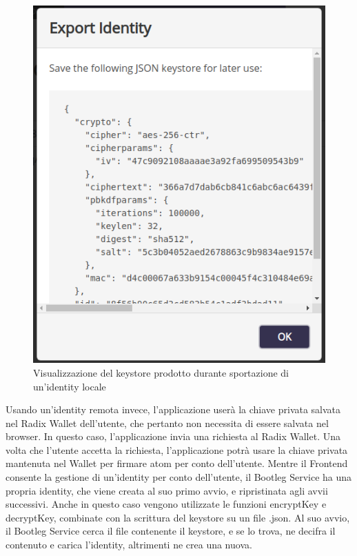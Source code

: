 \begin{figure}[H]
  \centering
  \includegraphics[scale=0.6]{images/application/save-keystore.png}
  \caption{Visualizzazione del keystore prodotto durante sportazione di un'identity locale}
  \label{fig:save_keystore}
\end{figure}

Usando un'identity remota invece, l'applicazione userà la chiave privata salvata nel Radix Wallet dell'utente, che pertanto non necessita di essere salvata nel browser. In questo caso, l'applicazione invia una richiesta al Radix Wallet. Una volta che l'utente accetta la richiesta, l'applicazione potrà usare la chiave privata mantenuta nel Wallet per firmare atom per conto dell'utente.
Mentre il Frontend consente la gestione di un'identity per conto dell'utente, il Bootleg Service ha una propria identity, che viene creata al suo primo avvio, e ripristinata agli avvii successivi. Anche in questo caso vengono utilizzate le funzioni encryptKey e decryptKey, combinate con la scrittura del keystore su un file .json. Al suo avvio, il Bootleg Service cerca il file contenente il keystore, e se lo trova, ne decifra il contenuto e carica l'identity, altrimenti ne crea una nuova.

